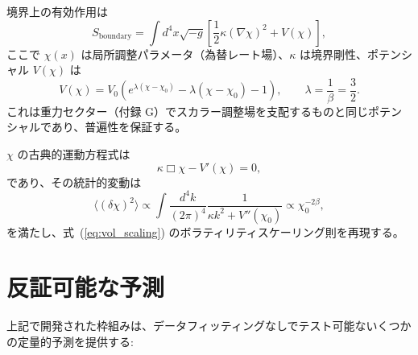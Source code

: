 \documentclass[12pt,a4paper]{article}
\theoremstyle{remark}
\begin{document}
	境界上の有効作用は
	\begin{equation}
		S_{\mathrm{boundary}} = \int d^4x \sqrt{-g} \left[ \frac{1}{2} \kappa (\nabla \chi)^2 + V(\chi) \right],
		\label{eq:action}
	\end{equation}
	ここで \(\chi(x)\) は局所調整パラメータ（為替レート場）、\(\kappa\) は境界剛性、ポテンシャル \(V(\chi)\) は
	\begin{equation}
		V(\chi) = V_0 \left( e^{\lambda(\chi - \chi_0)} - \lambda(\chi - \chi_0) - 1 \right), \qquad \lambda = \frac{1}{\beta} = \frac{3}{2}.
		\label{eq:potential}
	\end{equation}
	これは重力セクター（付録 G）でスカラー調整場を支配するものと同じポテンシャルであり、普遍性を保証する。
	
	\(\chi\) の古典的運動方程式は
	\begin{equation}
		\kappa \Box \chi - V'(\chi) = 0,
		\label{eq:eom}
	\end{equation}
	であり、その統計的変動は
	\begin{equation}
		\langle (\delta \chi)^2 \rangle \propto \int \frac{d^4k}{(2\pi)^4} \frac{1}{\kappa k^2 + V''(\chi_0)} \propto \chi_0^{-2\beta},
		\label{eq:fluctuations}
	\end{equation}
	を満たし、式~(\ref{eq:vol_scaling}) のボラティリティスケーリング則を再現する。
	
	\section{反証可能な予測}
	
	上記で開発された枠組みは、データフィッティングなしでテスト可能ないくつかの定量的予測を提供する:
	
\end{document}

